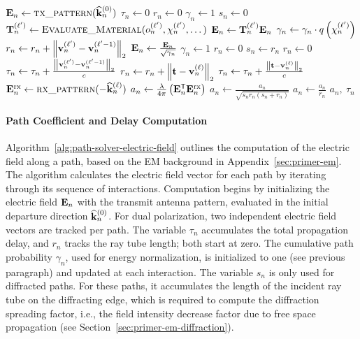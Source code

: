 \begin{algorithm}[ht!]
\caption{Electric field computation\label{alg:path-solver-electric-field}}
\begin{algorithmic}[1]
\State $\Em_n \gets \Call{tx\_pattern}{\widehat{\kv}^{(0)}_n}$ 
\State $\tau_n \gets 0$ 
\State $r_n \gets 0$ 
\State $\gamma_n \gets 1$ 
\State $s_n \gets 0$ 
    \State $\Tm_n^{(\ell')} \gets \Call{Evaluate\_Material}{o_n^{(\ell')}, \chi_n^{(\ell')}, \dots}$
    \State $\mathbf{E}_n \gets \mathbf{T}_n^{(\ell')} \mathbf{E}_n$
    \State $\gamma_n \gets \gamma_n \cdot q\left( \chi_n^{(\ell')}\right)$
    \State $r_n \gets r_n + \left\lVert\mathbf{v}_n^{(\ell')} - \mathbf{v}_n^{(\ell'-1)}\right\rVert_2$
        \State $\mathbf{E}_n \gets \frac{\mathbf{E}_n}{\sqrt{\gamma_n}}$
        \State $\gamma_n \gets 1$
        \State $r_n \gets 0$
        \State $s_n \gets r_n$
        \State $r_n \gets 0$
    \EndIf
    \State $\tau_n \gets \tau_n + \frac{\left\lVert\mathbf{v}_n^{(\ell')} - \mathbf{v}_n^{(\ell'-1)}\right\rVert_2}{c}$
\EndFor
\State $r_n \gets r_n + \left\lVert\mathbf{t} - \mathbf{v}_n^{(\ell)}\right\rVert_2$
\State $\tau_n \gets \tau_n + \frac{\left\lVert\mathbf{t} - \mathbf{v}_n^{(\ell)}\right\rVert_2}{c}$
\State $\Em_n^{\text{rx}} \gets \Call{rx\_pattern}{-\widehat{\kv}_n^{(\ell)}}$
\State $a_n \gets \frac{\lambda}{4\pi} \left( \mathbf{E}_n^{\mathsf{T}} \mathbf{E}_n^{\text{rx}} \right)$
 \label{line:sf-start}
    \State $a_n \gets  \frac{a_n}{\sqrt{s_nr_n(s_n + r_n)}}$
\Else
    \State $a_n \gets \frac{a_n}{r_n}$
\EndIf \label{line:sf-end}
\State \Return $a_n,~\tau_n$
\end{algorithmic}
\end{algorithm}

\paragraph{Path Coefficient and Delay Computation}
Algorithm~\ref{alg:path-solver-electric-field} outlines the computation of the electric field along a path, based on the \gls{EM} background in Appendix~\ref{sec:primer-em}.
The algorithm calculates the electric field vector for each path by iterating through its sequence of interactions.
Computation begins by initializing the electric field $\mathbf{E}_n$ with the transmit antenna pattern, evaluated in the initial departure direction $\widehat{\mathbf{k}}_n^{(0)}$.
For dual polarization, two independent electric field vectors are tracked per path.
The variable $\tau_n$ accumulates the total propagation delay, and $r_n$ tracks the ray tube length; both start at zero.
The cumulative path probability $\gamma_n$, used for energy normalization, is initialized to one (see previous paragraph) and updated at each interaction.
The variable $s_n$ is only used for diffracted paths. For these paths, it accumulates the length of the incident ray tube on the diffracting edge, which is required to compute the diffraction spreading factor, i.e., the field intensity decrease factor due to free space propagation (see Section~\ref{sec:primer-em-diffraction}).

